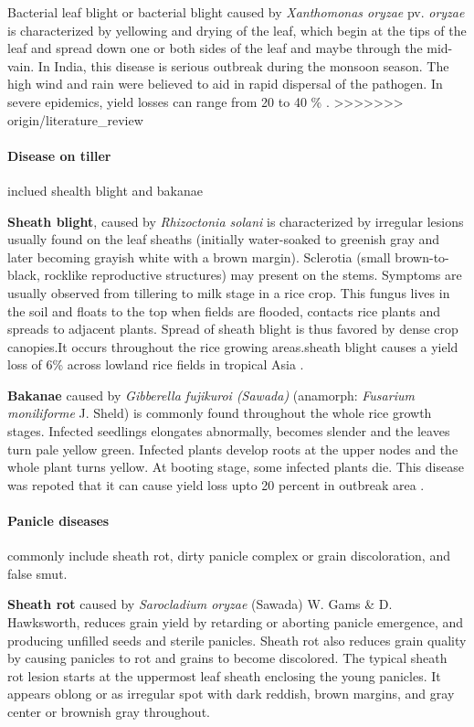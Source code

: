 \documentclass[12pt, oneside]{report}
\begin{document}

Bacterial leaf blight or bacterial blight caused by \textit{Xanthomonas oryzae} pv. \textit{oryzae} is characterized by yellowing and drying of the leaf, which  begin at the tips of the leaf and spread down one or both sides of the leaf and maybe through the mid-vain. In India, this disease is serious outbreak during the monsoon season. The high wind and rain were believed to aid in rapid dispersal of the pathogen. In severe epidemics, yield losses can range from 20 to 40 \% \citep{sonti1998bacterial}.
>>>>>>> origin/literature_review

\paragraph{Disease on tiller} inclued shealth blight and bakanae

 \textbf{Sheath blight}, caused by \textit{Rhizoctonia solani} is characterized by irregular lesions usually found on the leaf sheaths (initially water-soaked to greenish gray and later becoming grayish white with a brown margin). Sclerotia (small brown-to-black, rocklike reproductive structures) may present on the stems. Symptoms are usually observed from tillering to milk stage in a rice crop. This fungus lives in the soil and floats to the top when fields are flooded, contacts rice plants and spreads to adjacent plants. Spread of sheath blight is thus favored by dense crop canopies.It occurs throughout the rice growing areas.sheath blight causes a yield loss of 6\% across lowland rice fields in tropical Asia \cite{Savary:2006to}. 

\textbf{Bakanae} caused by \textit{Gibberella fujikuroi (Sawada)} (anamorph: \textit{Fusarium moniliforme} J. Sheld) is commonly found throughout the whole rice growth stages. Infected seedlings elongates abnormally, becomes slender and the leaves turn pale yellow green. Infected plants develop roots at the upper nodes and the whole plant turns yellow. At booting stage, some infected plants die. This disease was repoted that it can cause yield loss upto 20 percent in outbreak area \cite{irrirkb}.


\paragraph{Panicle diseases} commonly include sheath rot, dirty panicle complex or grain discoloration, and false smut.

\textbf{Sheath rot} caused by \textit{Sarocladium oryzae} (Sawada) W. Gams \& D. Hawksworth, reduces grain yield by retarding or aborting panicle emergence, and producing unfilled seeds and sterile panicles. Sheath rot also reduces grain quality by causing panicles to rot and grains to become discolored. The typical sheath rot lesion starts at the uppermost leaf sheath enclosing the young panicles. It appears oblong or as irregular spot with dark reddish, brown margins, and gray center or brownish gray throughout.
\end{document}

